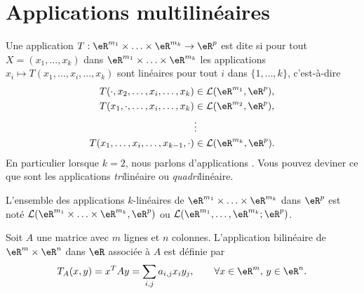 \section{Applications multilinéaires}

\begin{definition}       \label{DefFRHooKnPCT}
    Une application $T: \eR^{m_1}\times \ldots \times\eR^{m_k}\to\eR^p $ est dite  si pour tout $X=(x_1, \ldots,x_k)$ dans $ \eR^{m_1}\times \ldots \times\eR^{m_k}$ les applications $x_i\mapsto T(x_1, \ldots, x_i,\ldots,x_k)$ sont linéaires pour tout $i$ dans $\{1,\ldots,k\}$, c'est-à-dire
	\begin{equation}
		\begin{aligned}[]
			T(\cdot,x_2, \ldots, x_i,\ldots,x_k)&\in \mathcal{L}(\eR^{m_1}, \eR^p),\\
			T(x_1,\cdot, \ldots, x_i,\ldots,x_k)&\in \mathcal{L}(\eR^{m_2}, \eR^p),\\
						& \vdots\\
			T(x_1, \ldots, x_i,\ldots,x_{k-1},\cdot)&\in \mathcal{L}(\eR^{m_k}, \eR^p).\\
		\end{aligned}
	\end{equation}
	En particulier lorsque $k=2$, nous parlons d'applications . Vous pouvez deviner ce que sont les applications \emph{tri}linéaire ou \emph{quadri}linéaire.
\end{definition}

L'ensemble des applications $k$-linéaires de $ \eR^{m_1}\times \ldots \times\eR^{m_k}$ dans $\eR^p$ est noté $\mathcal{L}(\eR^{m_1}\times \ldots \times\eR^{m_k}, \eR^p)$ ou $\mathcal{L}(\eR^{m_1}, \ldots,\eR^{m_k}; \eR^p)$.

\begin{example}
  Soit $A$ une matrice avec $m$ lignes et $n$ colonnes. L'application bilinéaire de $\eR^m\times \eR^n$ dans $\eR$ associée à $A$ est définie par
\[
T_A(x,y)= x^TAy=\sum_{i,j}a_{i,j}x_i y_j, \qquad \forall x\in \eR^m, \, y \in \eR^n.
\]
\end{example}


